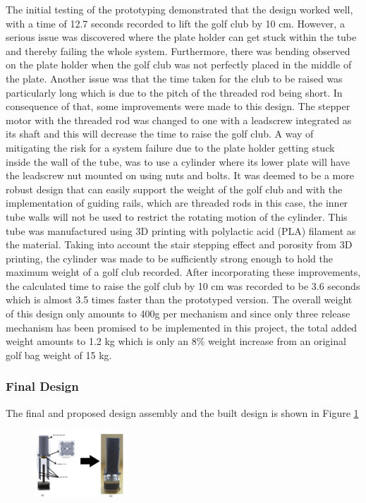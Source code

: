 \documentclass[11pt,landscape]{article}
\begin{document}
\begin{multicols}{2}
    The initial testing of the prototyping demonstrated that the design worked
    well, with a time of 12.7 seconds recorded to lift the golf club by 10 cm.
    However, a serious issue was discovered where the plate holder can get stuck
    within the tube and thereby failing the whole system. Furthermore, there was
    bending observed on the plate holder when the golf club was not perfectly
    placed in the middle of the plate. Another issue was that the time taken for
    the club to be raised was particularly long which is due to the pitch of the
    threaded rod being short. In consequence of that, some improvements were
    made to this design. The stepper motor with the threaded rod was changed to
    one with a leadscrew integrated as its shaft and this will decrease the time
    to raise the golf club.  A way of mitigating the risk for a system failure
    due to the plate holder getting stuck inside the wall of the tube, was to
    use a cylinder where its lower plate will have the leadscrew nut mounted on
    using nuts and bolts. It was deemed to be a more robust design that can
    easily support the weight of the golf club and with the implementation of
    guiding rails, which are threaded rods in this case, the inner tube walls
    will not be used to restrict the rotating motion of the cylinder. This tube
    was manufactured using 3D printing with polylactic acid (PLA) filament as
    the material. Taking into account the stair stepping effect and porosity
    from 3D printing, the cylinder was made to be sufficiently strong enough to
    hold the maximum weight of a golf club recorded. After incorporating these
    improvements, the calculated time to raise the golf club by 10 cm was
    recorded to be 3.6 seconds which is almost 3.5 times faster than the
    prototyped version. The overall weight of this design only amounts to 400g
    per mechanism and since only three release mechanism has been promised to be
    implemented in this project, the total added weight amounts to 1.2 kg which
    is only an 8\% weight increase from an original golf bag weight of 15 kg. 
    
    
    \subsubsection{Final Design}
    The final and proposed design assembly and the built design is shown in
    Figure \ref{fig:release1}
    
    \begin{figure}[H]
        \begin{center}
            \includegraphics[width=0.3\textwidth]{Figure21.jpg}
            \label{fig:release1}
        \end{center}
    \end{figure}
    

\end{multicols}
\end{document}
